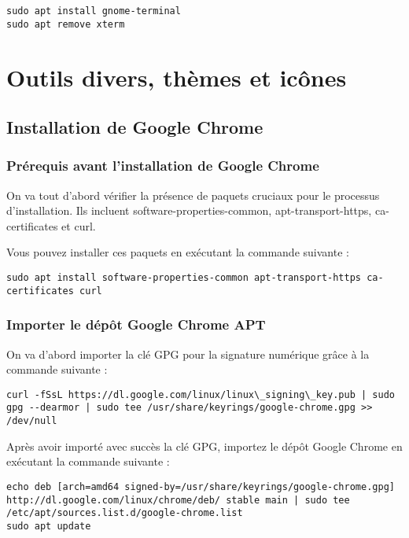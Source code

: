 \begin{lstlisting}
sudo apt install gnome-terminal
sudo apt remove xterm
\end{lstlisting}

\chapter{Outils divers, thèmes et icônes}

\section{Installation de Google Chrome}

\subsection{Prérequis avant l'installation de Google Chrome}

On va tout d'abord vérifier la présence de paquets cruciaux pour le processus d'installation. Ils incluent software-properties-common, apt-transport-https, ca-certificates et curl.

Vous pouvez installer ces paquets en exécutant la commande suivante :

\begin{lstlisting}
sudo apt install software-properties-common apt-transport-https ca-certificates curl
\end{lstlisting}

\subsection{Importer le dépôt Google Chrome APT}

On va d'abord importer la clé GPG pour la signature numérique grâce à la commande suivante :

\begin{lstlisting}
curl -fSsL https://dl.google.com/linux/linux\_signing\_key.pub | sudo gpg --dearmor | sudo tee /usr/share/keyrings/google-chrome.gpg >> /dev/null
\end{lstlisting}

Après avoir importé avec succès la clé GPG, importez le dépôt Google Chrome en exécutant la commande suivante :

\begin{lstlisting}
echo deb [arch=amd64 signed-by=/usr/share/keyrings/google-chrome.gpg] http://dl.google.com/linux/chrome/deb/ stable main | sudo tee /etc/apt/sources.list.d/google-chrome.list
sudo apt update
\end{lstlisting}


